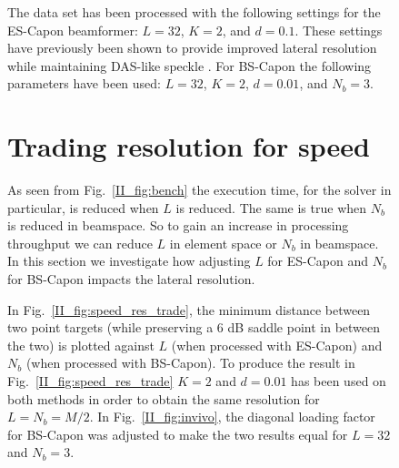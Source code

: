 \begin{figure}[!t]
The data set has been processed with the following settings for the ES-Capon beamformer: $L = 32$, $K = 2$, and $d=0.1$. These settings have previously been shown to provide improved lateral resolution while maintaining DAS-like speckle \cite{Synnevag2007a}. For BS-Capon the following parameters have been used: $L=32$, $K=2$, $d=0.01$, and $N_b=3$. 


\section{Trading resolution for speed}\label{II_sec:trade}
As seen from Fig.\ \ref{II_fig:bench} the execution time, for the solver in particular, is reduced when $L$ is reduced. The same is true when $N_b$ is reduced in beamspace. So to gain an  increase in processing throughput we can reduce $L$ in element space or $N_b$ in beamspace. In this section we investigate how adjusting $L$ for ES-Capon and $N_b$ for BS-Capon impacts the lateral resolution. 

In Fig.\ \ref{II_fig:speed_res_trade}, the minimum distance between two point targets (while preserving a 6 dB saddle point in between the two) is plotted against $L$ (when processed with ES-Capon) and $N_b$ (when processed with BS-Capon). To produce the result in Fig.\ \ref{II_fig:speed_res_trade} $K=2$ and $d=0.01$ has been used on both methods in order to obtain the same resolution for $L=N_b=M/2$. 
In Fig.\ \ref{II_fig:invivo}, the diagonal loading factor for BS-Capon was adjusted to make the two results equal for $L=32$ and $N_b=3$. %


\end{figure}
